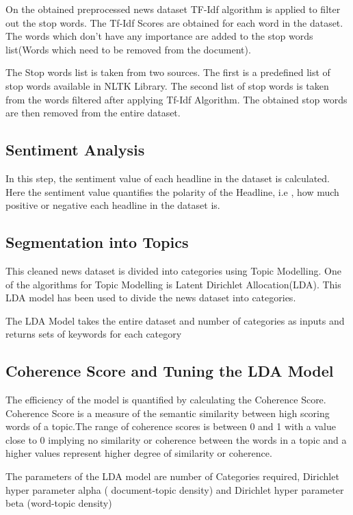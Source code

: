 \documentclass[preprint,12pt]{elsarticle}
\begin{document}
On the obtained preprocessed news dataset TF-Idf algorithm is applied to filter out the stop words. The Tf-Idf Scores are obtained for each word in the dataset. The words which don’t have any importance are added to the stop words list(Words which need to be removed from the document).

The Stop words list is taken from two sources. The first is a predefined list of stop words available in NLTK Library. The second list of stop words is taken from the words filtered after applying Tf-Idf Algorithm. The obtained stop words are then removed from the entire dataset.

\subsection{Sentiment Analysis}

In this step, the sentiment value of each headline in the dataset is calculated. Here the sentiment value quantifies the polarity of the Headline, i.e , how much positive or negative each headline in the dataset is.

\subsection{Segmentation into Topics}

This cleaned news dataset is divided into categories using Topic Modelling. One of the algorithms for Topic Modelling is Latent Dirichlet Allocation(LDA). This LDA model has been used to divide the news dataset into categories.

The LDA Model takes the entire dataset and number of categories as inputs and returns sets of keywords for each category

\subsection{Coherence Score and Tuning the LDA Model}

The efficiency of the model is quantified by calculating the Coherence Score. Coherence Score is a measure of the semantic similarity between high scoring words of a topic.The range of coherence scores is between 0 and 1 with a value close to 0 implying no similarity or coherence between the words in a topic and a higher values represent higher degree of similarity or coherence.

The parameters of the LDA model are number of Categories required, Dirichlet hyper parameter alpha ( document-topic density) and Dirichlet hyper parameter beta (word-topic density)
\end{document}
